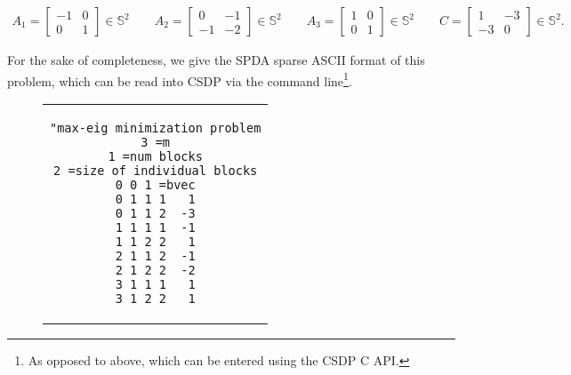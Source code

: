 \documentclass[a4paper]{article}
\begin{document}
\begin{align*}
A_1 = \begin{bmatrix}-1&0\\0&1\end{bmatrix}\in\mathbb{S}^2
\qquad
A_2 = \begin{bmatrix}0&-1\\-1&-2\end{bmatrix}\in\mathbb{S}^2
\qquad
A_3 = \begin{bmatrix}1&0\\0&1\end{bmatrix}\in\mathbb{S}^2
\qquad
C   = \begin{bmatrix}1&-3\\-3&0\end{bmatrix}\in\mathbb{S}^2.
\end{align*}

For the sake of completeness, we give the SPDA sparse ASCII format of this problem, which can be read into CSDP via the command line\footnote{As opposed to above, which can be entered using the CSDP C API.}.
\begin{figure}[bh!]
\centering
\begin{tabular}{c}
\begin{lstlisting}[]
"max-eig minimization problem
3 =m
1 =num blocks
2 =size of individual blocks
0 0 1 =bvec
0 1 1 1   1
0 1 1 2  -3
1 1 1 1  -1
1 1 2 2   1
2 1 1 2  -1
2 1 2 2  -2
3 1 1 1   1
3 1 2 2   1
\end{lstlisting}
\end{tabular}
\end{figure}
\end{document}
